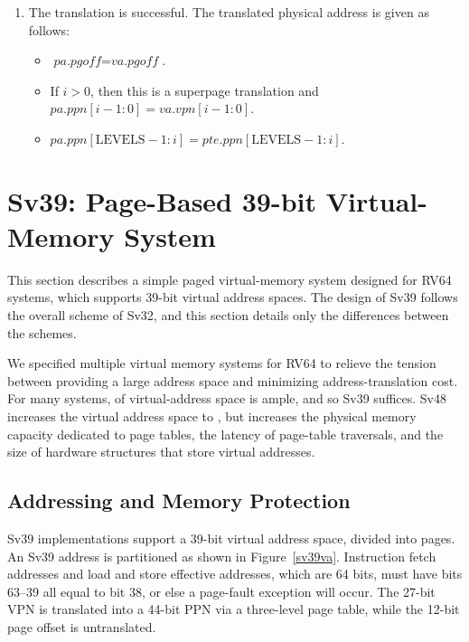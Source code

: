 \begin{enumerate}
\item The translation is successful. The translated physical address is
  given as follows:
\begin{itemize}
\item $\textit{pa.pgoff} = \textit{va.pgoff}$.
\item If $i>0$, then this is a superpage translation and $pa.ppn[i-1:0]=va.vpn[i-1:0]$.
\item $pa.ppn[\textrm{LEVELS} - 1:i] = pte.ppn[\textrm{LEVELS} - 1:i]$.
\end{itemize}

\end{enumerate}

\section{Sv39: Page-Based 39-bit Virtual-Memory System}
\label{sec:sv39}

This section describes a simple paged virtual-memory system designed
for RV64 systems, which supports 39-bit virtual address spaces.  The
design of Sv39 follows the overall scheme of Sv32, and this section
details only the differences between the schemes.

\begin{commentary}
We specified multiple virtual memory systems for RV64 to relieve the tension
between providing a large address space and minimizing address-translation
cost.  For many systems,  of virtual-address space is ample,
and so Sv39 suffices.  Sv48 increases the virtual address space to
, but increases the physical memory
capacity dedicated to page tables, the latency of page-table traversals, and
the size of hardware structures that store virtual addresses.
\end{commentary}

\subsection{Addressing and Memory Protection}

Sv39 implementations support a 39-bit virtual address space, divided
into  pages.  An Sv39 address is partitioned as
shown in Figure~\ref{sv39va}.
Instruction fetch addresses and load and store effective addresses,
which are 64 bits, must have bits 63--39 all equal to bit 38, or else
a page-fault exception will occur.  The 27-bit VPN is translated into a
44-bit PPN via a three-level page table, while the 12-bit page offset
is untranslated.

